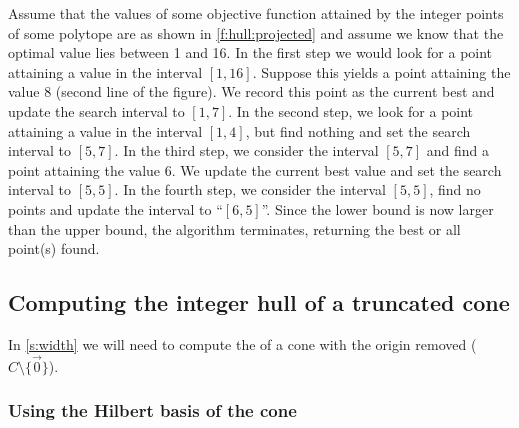\begin{example}
\label{ex:hull:projected}
Assume that the values of some objective function attained
by the integer points of some polytope are as shown in
\autoref{f:hull:projected} and assume we know that the optimal
value lies between 1 and 16.
In the first step we would look for a point attaining a value
in the interval $[1,16]$.  Suppose this yields a point attaining
the value $8$ (second line of the figure).  We record this point
as the current best and update the search interval to $[1,7]$.
In the second step, we look for a point attaining a value
in the interval $[1,4]$, but find nothing and set the search interval
to $[5,7]$.
In the third step, we consider the interval $[5,7]$ and find
a point attaining the value 6.  We update the current best value
and set the search interval to $[5,5]$.
In the fourth step, we consider the interval $[5,5]$, find no
points and update the interval to ``$[6,5]$''.
Since the lower bound is now larger than the upper bound, the
algorithm terminates, returning the best or all point(s) found.
\end{example}


\subsection{Computing the integer hull of a truncated cone}
\label{s:hull:cone}

In \autoref{s:width} we will need to compute the 
of a cone with the origin removed ($C \setminus \{ \vec 0 \}$).

\subsubsection{Using the Hilbert basis of the cone}

